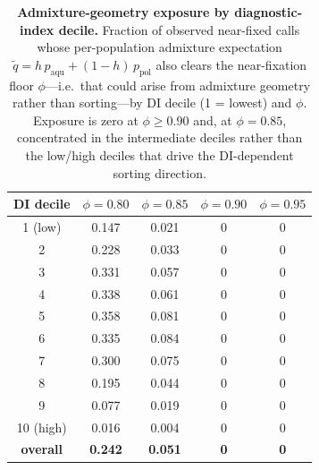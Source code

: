 \begin{table}[h]
\centering
\caption{\textbf{Admixture-geometry exposure by diagnostic-index decile.} Fraction of
observed near-fixed calls whose per-population admixture expectation $\tilde q = h\,p_{\mathrm{aqu}}
+ (1-h)\,p_{\mathrm{pol}}$ also clears the near-fixation floor $\phi$---i.e.\ that could arise from
admixture geometry rather than sorting---by DI decile (1 = lowest) and $\phi$. Exposure is zero at
$\phi \ge 0.90$ and, at $\phi = 0.85$, concentrated in the intermediate deciles rather than the
low/high deciles that drive the DI-dependent sorting direction.}
\label{tabS:admixture_exposure}
\begin{tabular}{ccccc}
\toprule
DI decile & $\phi=0.80$ & $\phi=0.85$ & $\phi=0.90$ & $\phi=0.95$ \\
\midrule
1 (low) & 0.147 & 0.021 & 0 & 0 \\
2 & 0.228 & 0.033 & 0 & 0 \\
3 & 0.331 & 0.057 & 0 & 0 \\
4 & 0.338 & 0.061 & 0 & 0 \\
5 & 0.358 & 0.081 & 0 & 0 \\
6 & 0.335 & 0.084 & 0 & 0 \\
7 & 0.300 & 0.075 & 0 & 0 \\
8 & 0.195 & 0.044 & 0 & 0 \\
9 & 0.077 & 0.019 & 0 & 0 \\
10 (high) & 0.016 & 0.004 & 0 & 0 \\
\midrule
\textbf{overall} & \textbf{0.242} & \textbf{0.051} & \textbf{0} & \textbf{0} \\
\bottomrule
\end{tabular}
\end{table}
